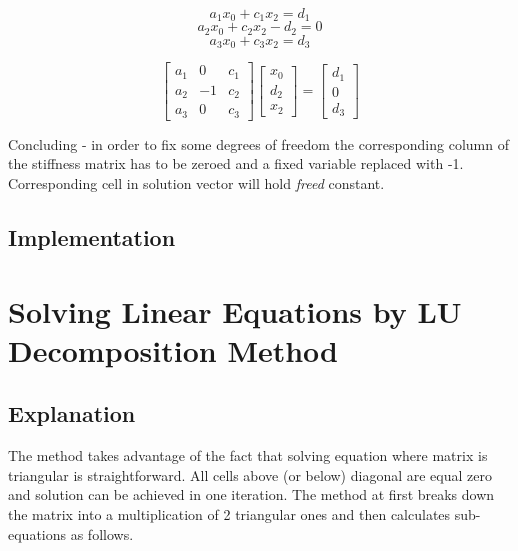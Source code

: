 \begin{equation}
a_1 x_0 + c_1 x_2 = d_1
\end{equation}
\begin{equation}
a_2 x_0 + c_2 x_2 - d_2 = 0
\end{equation}
\begin{equation}
a_3 x_0 + c_3 x_2 = d_3
\end{equation}

\begin{equation}
\begin{bmatrix}
	a_1 & 0 & c_1 \\
	a_2 & -1 & c_2 \\
	a_3 & 0 & c_3
\end{bmatrix}
\begin{bmatrix}
	x_0 \\
	d_2 \\
	x_2
\end{bmatrix}
=
\begin{bmatrix}
	d_1 \\
	0 \\
	d_3
\end{bmatrix}
\end{equation}

Concluding - in order to fix some degrees of freedom the corresponding column of the stiffness matrix has to be zeroed and a fixed variable replaced with -1. Corresponding cell in solution vector will hold \textit{freed} constant.



\subsection{Implementation}



\section{Solving Linear Equations by LU Decomposition Method}

\subsection{Explanation}

The method takes advantage of the fact that solving equation where matrix is triangular is straightforward. All cells above (or below) diagonal are equal zero and solution can be achieved in one iteration. The method at first breaks down the matrix into a multiplication of 2 triangular ones and then calculates sub-equations as follows.

